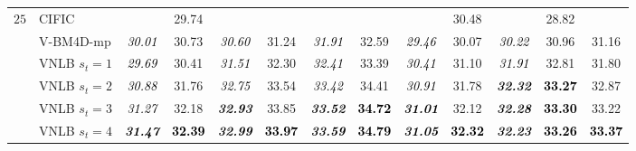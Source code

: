 \documentclass[10pt, journal, twocolumn, final, a4paper]{IEEEtran}
\newcommand{\best}[1]{#1}
\newcommand{\bsic}[1]{\textcolor{black}{\textit{#1}}}
\newcommand{\Bsic}[1]{\textcolor{black}{\textbf{\textit{#1}}}}
\newcommand{\Best}[1]{\textbf{\textcolor{black}{#1}}}
\begin{document}
\begin{table}[htp!]
\begin{center}
{\begin{tabular}{ c | l |c c | c c | c c | c c | c c | c}
%
%
			\multirow{1}{*}{$25$}
			                      & CIFIC                & \bsic{     } &       29.74  & \bsic{     } &              & \bsic{     } &              & \bsic{     } &       30.48  & \bsic{     } &       28.82  &              \\
			                      & V-BM4D-mp            & \bsic{30.01} &       30.73  & \bsic{30.60} &       31.24  & \bsic{31.91} &       32.59  & \bsic{29.46} &       30.07  & \bsic{30.22} &       30.96  &       31.16  \\
			                      & VNLB   $s_t = 1$     & \bsic{29.69} &       30.41  & \bsic{31.51} &       32.30  & \bsic{32.41} &       33.39  & \bsic{30.41} &       31.10  & \bsic{31.91} &       32.81  &       31.80  \\
			                      & VNLB   $s_t = 2$     & \bsic{30.88} &       31.76  & \bsic{32.75} &       33.54  & \bsic{33.42} &       34.41  & \bsic{30.91} &       31.78  & \Bsic{32.32} & \Best{33.27} &       32.87  \\
			                      & VNLB   $s_t = 3$     & \bsic{31.27} &       32.18  & \Bsic{32.93} &       33.85  & \Bsic{33.52} & \Best{34.72} & \Bsic{31.01} &       32.12  & \Bsic{32.28} & \Best{33.30} &       33.22  \\
			                      & VNLB   $s_t = 4$     & \Bsic{31.47} & \Best{32.39} & \Bsic{32.99} & \Best{33.97} & \Bsic{33.59} & \Best{34.79} & \Bsic{31.05} & \Best{32.32} & \Bsic{32.23} & \Best{33.26} & \Best{33.37} \\\hline

\end{tabular}}
\end{center}
\end{table}
\end{document}
